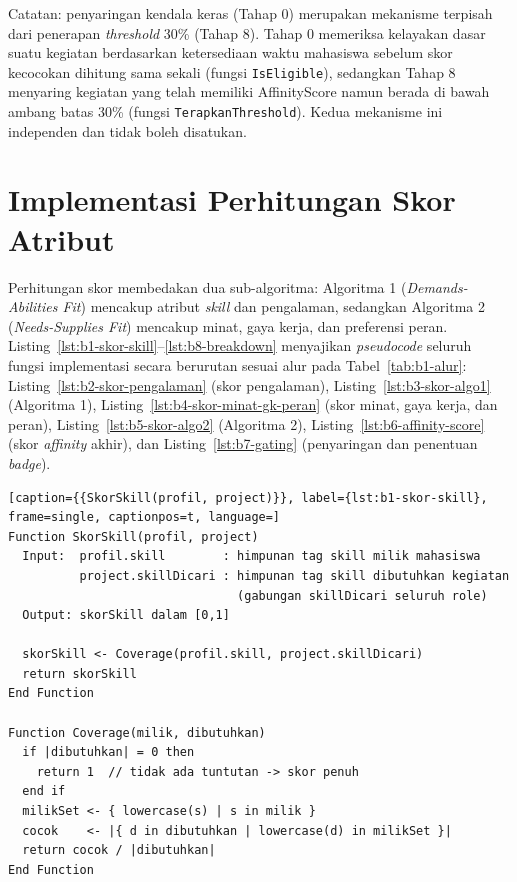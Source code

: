 Catatan: penyaringan kendala keras (Tahap 0) merupakan mekanisme terpisah dari penerapan \emph{threshold} 30\% (Tahap 8). Tahap 0 memeriksa kelayakan dasar suatu kegiatan berdasarkan ketersediaan waktu mahasiswa sebelum skor kecocokan dihitung sama sekali (fungsi \texttt{IsEligible}), sedangkan Tahap 8 menyaring kegiatan yang telah memiliki AffinityScore namun berada di bawah ambang batas 30\% (fungsi \texttt{TerapkanThreshold}). Kedua mekanisme ini independen dan tidak boleh disatukan.

\section{Implementasi Perhitungan Skor Atribut}
\label{sec:b-implementasi-skor}

Perhitungan skor membedakan dua sub-algoritma: Algoritma 1 (\emph{Demands-Abilities Fit}) mencakup atribut \emph{skill} dan pengalaman, sedangkan Algoritma 2 (\emph{Needs-Supplies Fit}) mencakup minat, gaya kerja, dan preferensi peran. Listing~\ref{lst:b1-skor-skill}--\ref{lst:b8-breakdown} menyajikan \emph{pseudocode} seluruh fungsi implementasi secara berurutan sesuai alur pada Tabel~\ref{tab:b1-alur}: Listing~\ref{lst:b2-skor-pengalaman} (skor pengalaman), Listing~\ref{lst:b3-skor-algo1} (Algoritma 1), Listing~\ref{lst:b4-skor-minat-gk-peran} (skor minat, gaya kerja, dan peran), Listing~\ref{lst:b5-skor-algo2} (Algoritma 2), Listing~\ref{lst:b6-affinity-score} (skor \emph{affinity} akhir), dan Listing~\ref{lst:b7-gating} (penyaringan dan penentuan \emph{badge}).

\begin{minipage}{\textwidth}
\begin{lstlisting}[caption={{SkorSkill(profil, project)}}, label={lst:b1-skor-skill}, frame=single, captionpos=t, language=]
Function SkorSkill(profil, project)
  Input:  profil.skill        : himpunan tag skill milik mahasiswa
          project.skillDicari : himpunan tag skill dibutuhkan kegiatan
                                (gabungan skillDicari seluruh role)
  Output: skorSkill dalam [0,1]

  skorSkill <- Coverage(profil.skill, project.skillDicari)
  return skorSkill
End Function

Function Coverage(milik, dibutuhkan)
  if |dibutuhkan| = 0 then
    return 1  // tidak ada tuntutan -> skor penuh
  end if
  milikSet <- { lowercase(s) | s in milik }
  cocok    <- |{ d in dibutuhkan | lowercase(d) in milikSet }|
  return cocok / |dibutuhkan|
End Function
\end{lstlisting}
\end{minipage}

